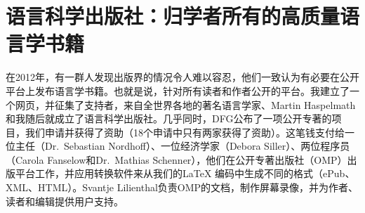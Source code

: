 \section*{语言科学出版社：归学者所有的高质量语言学书籍}

在2012年，有一群人发现出版界的情况令人难以容忍，他们一致认为有必要在公开平台上发布语言学书籍。也就是说，针对所有读者和作者公开的平台。我建立了一个网页，并征集了支持者，来自全世界各地的著名语言学家、Martin Haspelmath和我随后就成立了语言科学出版社。几乎同时，DFG公布了一项公开专著的项目，我们申请\citep{MH2013a}并获得了资助（18个申请中只有两家获得了资助）。这笔钱支付给一位主任（Dr.\ Sebastian Nordhoff）、一位经济学家（Debora Siller）、两位程序员（Carola Fanselow和Dr.\ Mathias Schenner），他们在公开专著出版社（OMP）出版平台工作，并应用转换软件来从我们的\LaTeX{} 编码中生成不同的格式（ePub、XML、HTML）。Svantje Lilienthal负责OMP的文档，制作屏幕录像，并为作者、读者和编辑提供用户支持。

